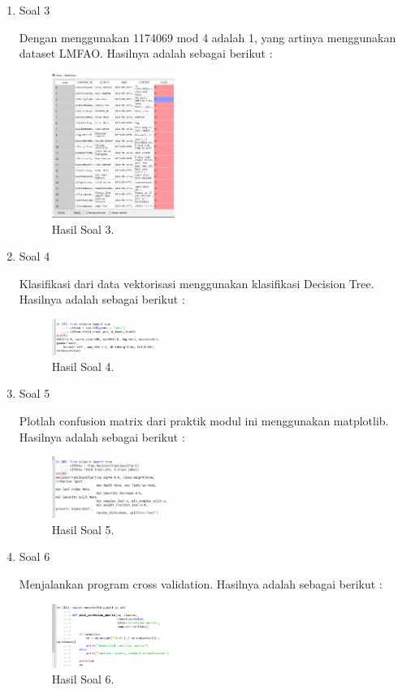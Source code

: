 \begin{enumerate}
	\item Soal 3
	\hfill\break
	
	Dengan menggunakan 1174069 mod 4 adalah 1, yang artinya menggunakan dataset LMFAO. Hasilnya adalah sebagai berikut :
	\begin{figure}[H]
	\centering
		\includegraphics[width=4cm]{figures/1174069/4/materi/hasil31.PNG}
		\caption{Hasil Soal 3.}
	\end{figure}

	\item Soal 4
	\hfill\break
	
	Klasifikasi dari data vektorisasi menggunakan klasifikasi Decision Tree. Hasilnya adalah sebagai berikut :
	\begin{figure}[H]
	\centering
		\includegraphics[width=4cm]{figures/1174069/4/materi/hasil4.PNG}
		\caption{Hasil Soal 4.}
	\end{figure}

	\item Soal 5
	\hfill\break
	
	Plotlah confusion matrix dari praktik modul ini menggunakan matplotlib. Hasilnya adalah sebagai berikut :
	\begin{figure}[H]
	\centering
		\includegraphics[width=4cm]{figures/1174069/4/materi/hasil5.PNG}
		\caption{Hasil Soal 5.}
	\end{figure}

	\item Soal 6
	\hfill\break
	
	Menjalankan program cross validation. Hasilnya adalah sebagai berikut :
	\begin{figure}[H]
	\centering
		\includegraphics[width=4cm]{figures/1174069/4/materi/hasil6.PNG}
		\caption{Hasil Soal 6.}
	\end{figure}


\end{enumerate}
